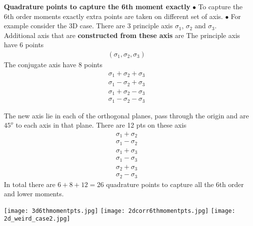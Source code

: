 \documentclass[landscape]{slides}
\begin{document}
\begin{slide}
{\bf Quadrature points to capture the 6th moment exactly }\newline
$\bullet$ To capture the 6th order moments exactly extra points are taken on different set of axis.\newline
$\bullet$ For example consider the 3D case. There are 3 principle axis $\sigma_1$, $\sigma_2$ and $\sigma_3$. Additional axis that are {\bf constructed from these axis} are\newline
The principle axis have 6 points
 \begin{align*}
 (\sigma_1,
 \sigma_2,
 \sigma_3)
 \end{align*}
The conjugate axis have 8 points
\begin{align*}
\sigma_1+\sigma_2+\sigma_3\\
\sigma_1-\sigma_2+\sigma_3\\
\sigma_1+\sigma_2-\sigma_3\\
\sigma_1-\sigma_2-\sigma_3
\end{align*}
   	\end{slide}
\begin{slide}
The new axis lie in each of the orthogonal planes, pass through the origin and are $45^o$ to each axis in that plane. There are 12 pts on these axis
\begin{align*}
\sigma_1+\sigma_2\\
\sigma_1-\sigma_2\\
\sigma_1+\sigma_3\\
\sigma_1-\sigma_3\\
\sigma_2+\sigma_3\\
\sigma_2-\sigma_3
\end{align*}
 In total there are $6+8+12=26$ quadrature points to capture all the 6th order and lower moments.
    	\end{slide}
\begin{slide} 
	\centering
		\texttt{[image: 3d6thmomentpts.jpg]}
	\label{fig:3d6thmomentpts}
\newline
	\texttt{[image: 2dcorr6thmomentpts.jpg]}
	\texttt{[image: 2d\_weird\_case2.jpg]}
	\label{fig:eye2quadpts}
\end{slide}
\end{document}
